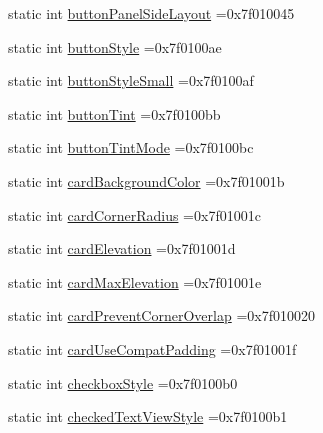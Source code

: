 \begin{DoxyCompactItemize}
\item 
static int \hyperlink{classandroid_1_1support_1_1graphics_1_1drawable_1_1R_1_1attr_a889359a9efee0aca0f013715032919fd}{button\+Panel\+Side\+Layout} =0x7f010045
\item 
static int \hyperlink{classandroid_1_1support_1_1graphics_1_1drawable_1_1R_1_1attr_a13a6bfae7efa06b925920bc78ad38ee0}{button\+Style} =0x7f0100ae
\item 
static int \hyperlink{classandroid_1_1support_1_1graphics_1_1drawable_1_1R_1_1attr_a7ee5f2b51ffd5c244c8e0fd897a25a37}{button\+Style\+Small} =0x7f0100af
\item 
static int \hyperlink{classandroid_1_1support_1_1graphics_1_1drawable_1_1R_1_1attr_a409acd4db013848e27f5dedf1559df6f}{button\+Tint} =0x7f0100bb
\item 
static int \hyperlink{classandroid_1_1support_1_1graphics_1_1drawable_1_1R_1_1attr_a73d0d1895909d66c3ba9ce5573ea0cce}{button\+Tint\+Mode} =0x7f0100bc
\item 
static int \hyperlink{classandroid_1_1support_1_1graphics_1_1drawable_1_1R_1_1attr_a9d3f952b0186315e98fb7a516381df4d}{card\+Background\+Color} =0x7f01001b
\item 
static int \hyperlink{classandroid_1_1support_1_1graphics_1_1drawable_1_1R_1_1attr_a0845abda5f33cbe27e36f5faa30c0972}{card\+Corner\+Radius} =0x7f01001c
\item 
static int \hyperlink{classandroid_1_1support_1_1graphics_1_1drawable_1_1R_1_1attr_a286106e5c8b86045d205db201bfe4620}{card\+Elevation} =0x7f01001d
\item 
static int \hyperlink{classandroid_1_1support_1_1graphics_1_1drawable_1_1R_1_1attr_a20a27799ec95b449d68f639c8fc0b0d4}{card\+Max\+Elevation} =0x7f01001e
\item 
static int \hyperlink{classandroid_1_1support_1_1graphics_1_1drawable_1_1R_1_1attr_a207af6077044f4a78d562b17e18e9d64}{card\+Prevent\+Corner\+Overlap} =0x7f010020
\item 
static int \hyperlink{classandroid_1_1support_1_1graphics_1_1drawable_1_1R_1_1attr_accd8c0f7b970bea08effa8f74765292d}{card\+Use\+Compat\+Padding} =0x7f01001f
\item 
static int \hyperlink{classandroid_1_1support_1_1graphics_1_1drawable_1_1R_1_1attr_a6c538f08a5a6b7fa5cc2eb8e3be0fcc0}{checkbox\+Style} =0x7f0100b0
\item 
static int \hyperlink{classandroid_1_1support_1_1graphics_1_1drawable_1_1R_1_1attr_a756450421a818fa4152f843c3a6ef4ae}{checked\+Text\+View\+Style} =0x7f0100b1
\item 

\end{DoxyCompactItemize}
